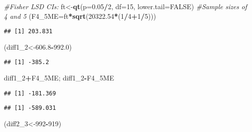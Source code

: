 \documentclass[]{article}
\newenvironment{Shaded}{\begin{snugshade}}{\end{snugshade}}
\newcommand{\KeywordTok}[1]{\textcolor[rgb]{0.13,0.29,0.53}{\textbf{#1}}}
\newcommand{\DataTypeTok}[1]{\textcolor[rgb]{0.13,0.29,0.53}{#1}}
\newcommand{\DecValTok}[1]{\textcolor[rgb]{0.00,0.00,0.81}{#1}}
\newcommand{\FloatTok}[1]{\textcolor[rgb]{0.00,0.00,0.81}{#1}}
\newcommand{\CommentTok}[1]{\textcolor[rgb]{0.56,0.35,0.01}{\textit{#1}}}
\newcommand{\OtherTok}[1]{\textcolor[rgb]{0.56,0.35,0.01}{#1}}
\newcommand{\OperatorTok}[1]{\textcolor[rgb]{0.81,0.36,0.00}{\textbf{#1}}}
\newcommand{\NormalTok}[1]{#1}
\begin{document}
\begin{Shaded}
\begin{Highlighting}[]
\CommentTok{#Fisher LSD CIs:}
\NormalTok{ft<-}\KeywordTok{qt}\NormalTok{(}\DataTypeTok{p=}\FloatTok{0.05}\OperatorTok{/}\DecValTok{2}\NormalTok{, }\DataTypeTok{df=}\DecValTok{15}\NormalTok{, }\DataTypeTok{lower.tail=}\OtherTok{FALSE}\NormalTok{)}
\CommentTok{#Sample sizes of 4 and 5}
\NormalTok{(}\DataTypeTok{F4_5ME=}\NormalTok{ft}\OperatorTok{*}\KeywordTok{sqrt}\NormalTok{(}\FloatTok{20322.54}\OperatorTok{*}\NormalTok{(}\DecValTok{1}\OperatorTok{/}\DecValTok{4}\OperatorTok{+}\DecValTok{1}\OperatorTok{/}\DecValTok{5}\NormalTok{)))}
\end{Highlighting}
\end{Shaded}

\begin{verbatim}
## [1] 203.831
\end{verbatim}

\begin{Shaded}
\begin{Highlighting}[]
\NormalTok{(diff1_}\DecValTok{2}\NormalTok{<-}\FloatTok{606.8}\OperatorTok{-}\FloatTok{992.0}\NormalTok{)}
\end{Highlighting}
\end{Shaded}

\begin{verbatim}
## [1] -385.2
\end{verbatim}

\begin{Shaded}
\begin{Highlighting}[]
\NormalTok{diff1_}\DecValTok{2}\OperatorTok{+}\NormalTok{F4_5ME; diff1_}\DecValTok{2}\OperatorTok{-}\NormalTok{F4_5ME}
\end{Highlighting}
\end{Shaded}

\begin{verbatim}
## [1] -181.369
\end{verbatim}

\begin{verbatim}
## [1] -589.031
\end{verbatim}

\begin{Shaded}
\begin{Highlighting}[]
\NormalTok{(diff2_}\DecValTok{3}\NormalTok{<-}\DecValTok{992}\OperatorTok{-}\DecValTok{919}\NormalTok{)}
\end{Highlighting}
\end{Shaded}
\end{document}

